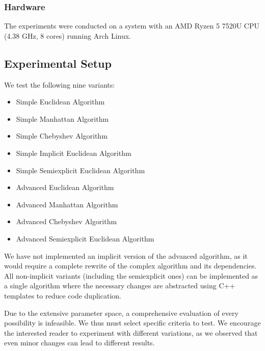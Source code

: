 \subsubsection{Hardware}
\label{subsubsec:hardware}
The experiments were conducted on a system with an AMD Ryzen 5 7520U CPU (4.38 GHz, 8 cores) running Arch Linux.

\subsection{Experimental Setup}
\label{subsec:exp_setup}

We test the following nine variants:
\begin{itemize}
	\item Simple Euclidean Algorithm
	\item Simple Manhattan Algorithm
	\item Simple Chebyshev Algorithm
	\item Simple Implicit Euclidean Algorithm
	\item Simple Semiexplicit Euclidean Algorithm
	\item Advanced Euclidean Algorithm
	\item Advanced Manhattan Algorithm
	\item Advanced Chebyshev Algorithm
	\item Advanced Semiexplicit Euclidean Algorithm
\end{itemize}

We have not implemented an implicit version of the advanced algorithm, as it would require a complete rewrite of the complex \citeauthor{polyline_simplification_has_cubic_complexity_bringmannetal} algorithm and its dependencies. All non-implicit variants (including the semiexplicit ones) can be implemented as a single algorithm where the necessary changes are abstracted using C++ templates to reduce code duplication.

Due to the extensive parameter space, a comprehensive evaluation of every possibility is infeasible. We thus must select specific criteria to test. We encourage the interested reader to experiment with different variations, as we observed that even minor changes can lead to different results.

